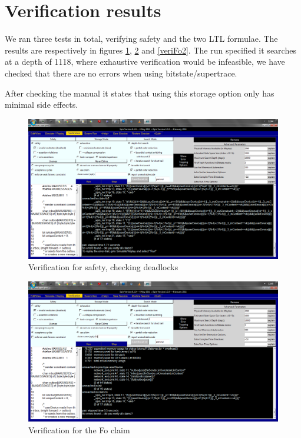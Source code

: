 \documentclass[9pt,a4paper]{article}
\begin{document}
	\section{Verification results}
	
	We ran three tests in total, verifying safety and the two LTL formulae. The results are respectively in figures \ref{veriSafety}, \ref{veriFo} and \ref{veriFo2}.
	The run specified it searches at a depth of 1118, where exhaustive verification would be infeasible, we have checked that there are no errors when using bitstate/supertrace.
	
	After checking the manual it states that using this storage option only has minimal side effects. 
	
	\begin{figure}[t]
		\includegraphics[angle=90,totalheight=\textheight]{screenshots/verification_safety.png}
		\caption{Verification for safety, checking deadlocks}
		\label{veriSafety}
	\end{figure}

	\begin{figure}[t]
		\includegraphics[angle=90,totalheight=\textheight]{screenshots/verification_fo.png}
		\caption{Verification for the Fo claim}
		\label{veriFo}
	\end{figure}
	
\end{document}
